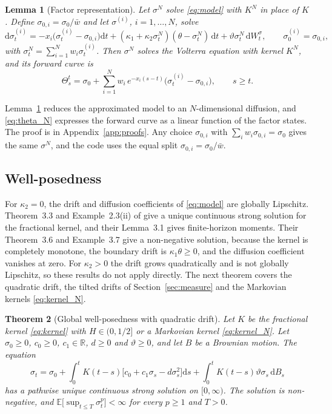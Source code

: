 \documentclass[11pt,a4paper]{article}
\newtheorem{theorem}{Theorem}[section]
\newtheorem{lemma}[theorem]{Lemma}
\theoremstyle{definition}
\newcommand{\D}{\mathrm{d}}
\newcommand{\E}{\mathbb{E}}
\begin{document}
\begin{lemma}[Factor representation]\label{lem:factors}
Let $\sigma^N$ solve \eqref{eq:model} with $K^N$ in place of $K$. Define $\sigma_{0,i}=\sigma_0/\bar w$ and let $\sigma^{(i)}$, $i=1,\dots,N$, solve
\begin{equation}\label{eq:factors}
\D\sigma^{(i)}_t=-x_i\big(\sigma^{(i)}_t-\sigma_{0,i}\big)\D t+(\kappa_1+\kappa_2\sigma^N_t)(\theta-\sigma^N_t)\,\D t+\vartheta\sigma^N_t\,\D W^\sigma_t,\qquad \sigma^{(i)}_0=\sigma_{0,i},
\end{equation}
with $\sigma^N_t=\sum_{i=1}^N w_i\sigma^{(i)}_t$. Then $\sigma^N$ solves the Volterra equation with kernel $K^N$, and its forward curve is
\begin{equation}\label{eq:theta_N}
\Theta^{t}_s=\sigma_0+\sum_{i=1}^N w_i\,e^{-x_i(s-t)}\big(\sigma^{(i)}_t-\sigma_{0,i}\big),\qquad s\ge t .
\end{equation}
\end{lemma}

Lemma~\ref{lem:factors} reduces the approximated model to an $N$-dimensional diffusion, and \eqref{eq:theta_N} expresses the forward curve as a linear function of the factor states. The proof is in Appendix~\ref{app:proofs}. Any choice $\sigma_{0,i}$ with $\sum_i w_i\sigma_{0,i}=\sigma_0$ gives the same $\sigma^N$, and the code uses the equal split $\sigma_{0,i}=\sigma_0/\bar w$.


\subsection{Well-posedness}

For $\kappa_2=0$, the drift and diffusion coefficients of \eqref{eq:model} are globally Lipschitz. Theorem~3.3 and Example~2.3(ii) of \citet{AbiJaberLarssonPulido2019} give a unique continuous strong solution for the fractional kernel, and their Lemma~3.1 gives finite-horizon moments. Their Theorem~3.6 and Example~3.7 give a non-negative solution, because the kernel is completely monotone, the boundary drift is $\kappa_1\theta\ge0$, and the diffusion coefficient vanishes at zero. For $\kappa_2>0$ the drift grows quadratically and is not globally Lipschitz, so these results do not apply directly. The next theorem covers the quadratic drift, the tilted drifts of Section~\ref{sec:measure} and the Markovian kernels \eqref{eq:kernel_N}.

\begin{theorem}[Global well-posedness with quadratic drift]\label{thm:wellposed}
Let $K$ be the fractional kernel \eqref{eq:kernel} with $H\in(0,1/2]$ or a Markovian kernel \eqref{eq:kernel_N}. Let $\sigma_0\ge0$, $c_0\ge0$, $c_1\in\mathbb R$, $d\ge0$ and $\vartheta\ge0$, and let $B$ be a Brownian motion. The equation
\begin{equation}\label{eq:sve_general}
\sigma_t=\sigma_0+\int_0^tK(t-s)\big[c_0+c_1\sigma_s-d\sigma_s^2\big]\D s+\int_0^tK(t-s)\vartheta\sigma_s\,\D B_s
\end{equation}
has a pathwise unique continuous strong solution on $[0,\infty)$. The solution is non-negative, and $\E\big[\sup_{t\le T}\sigma_t^p\big]<\infty$ for every $p\ge1$ and $T>0$.
\end{theorem}
\end{document}
